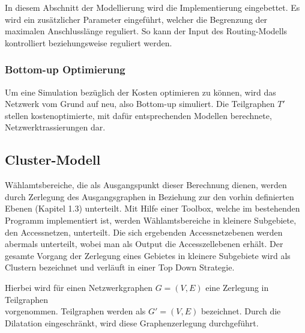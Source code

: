 In diesem Abschnitt der Modellierung wird die Implementierung eingebettet. Es wird ein zusätzlicher Parameter eingeführt, welcher die Begrenzung der 
maximalen Anschlusslänge reguliert. So kann der Input des Routing-Modells kontrolliert beziehungsweise reguliert werden.




\subsubsection{Bottom-up Optimierung}
\label{sec:2methoden}


\vspace{0.3cm}

Um eine Simulation bezüglich der Kosten optimieren zu können, wird das Netzwerk vom Grund auf neu, also Bottom-up simuliert.
Die Teilgraphen $T'$ stellen kostenoptimierte, mit dafür entsprechenden Modellen berechnete, Netzwerktrassierungen dar.


\vspace{1cm}
\subsection{Cluster-Modell}
\label{sec:2 modelle}


\vspace{0.5cm}

\par Wählamtsbereiche, die als Ausgangspunkt dieser Berechnung dienen, werden durch Zerlegung des Ausgangsgraphen in Beziehung zur den vorhin definierten
Ebenen (Kapitel 1.3) unterteilt. 
Mit Hilfe einer Toolbox, welche im bestehenden Programm implementiert ist, werden Wählamtsbereiche in kleinere Subgebiete, den Accessnetzen, unterteilt. 
Die sich ergebenden Accessnetzebenen werden abermals unterteilt, wobei man als Output die Accesszellebenen erhält. Der gesamte Vorgang der Zerlegung eines
Gebietes in kleinere Subgebiete wird als Clustern bezeichnet und verläuft in einer Top Down Strategie.

\par Hierbei wird für einen Netzwerkgraphen $G=(V,E)$ eine Zerlegung in Teilgraphen\\ vorgenommen. Teilgraphen werden als $G' =(V,E)$ bezeichnet.
Durch die Dilatation eingeschränkt, wird diese Graphenzerlegung durchgeführt. 
\vspace{0.3cm}

